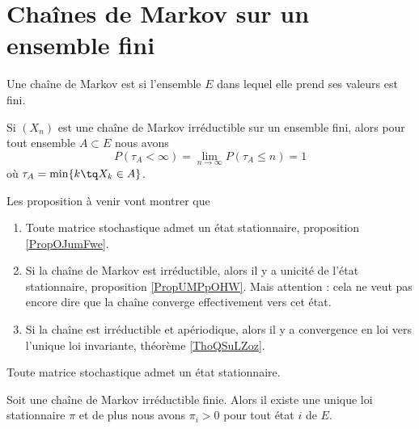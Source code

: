 \section{Chaînes de Markov sur un ensemble fini}

Une chaîne de Markov est  si l'ensemble \( E\) dans lequel elle prend ses valeurs est fini.

\begin{proposition}
    Si \( (X_n)\) est une chaîne de Markov irréductible sur un ensemble fini, alors pour tout ensemble \( A\subset E\) nous avons
    \begin{equation}
        P(\tau_A<\infty)=\lim_{n\to \infty} P(\tau_A\leq n)=1
    \end{equation}
    où \( \tau_A=\min\{ k\tq X_k\in A \}\).
\end{proposition}

Les proposition à venir vont montrer que
\begin{enumerate}
    \item
        Toute matrice stochastique admet un état stationnaire, proposition \ref{PropOJumFwe}.
    \item
        Si la chaîne de Markov est irréductible, alors il y a unicité de l'état stationnaire, proposition \ref{PropUMPpOHW}. Mais attention : cela ne veut pas encore dire que la chaîne converge effectivement vers cet état.
    \item
        Si la chaîne est irréductible et apériodique, alors il y a convergence en loi vers l'unique loi invariante, théorème \ref{ThoQSuLZoz}.
\end{enumerate}

\begin{proposition} \label{PropOJumFwe}
    Toute matrice stochastique admet un état stationnaire.
\end{proposition}

\begin{proposition}     \label{PropUMPpOHW}
    Soit une chaîne de Markov irréductible finie. Alors il existe une unique loi stationnaire \( \pi\) et de plus nous avons \( \pi_i>0\) pour tout état \( i\) de \( E\).
\end{proposition}

